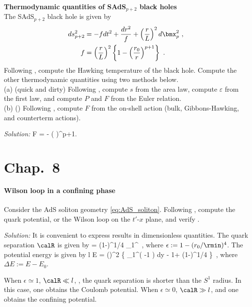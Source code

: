 \begin{prob}
\textbf{Thermodynamic quantities of SAdS$_{p+2}$ black holes}\\
The SAdS$_{p+2}$ black hole is given by
\begin{align}
%
ds_{p+2}^2 &= - f dt^2  + \frac{dr^2}{f} + \left(\frac{r}{L}\right)^2 d\bmx_{p}^2~, \\
f &= \left(\frac{r}{L}\right)^2 \left\{ 1 - \left( \frac{r_0}{r} \right)^{p+1} \right\}~.
%
\end{align}
Following , compute the Hawking temperature of the black hole. Compute the other thermodynamic quantities using two methods below.\\
(a) (quick and dirty) 
Following , compute $s$ from the area law, compute $\varepsilon$ from the first law, and compute $P$ and $F$ from the Euler relation.\\
(b) ()
Following , compute $F$ from the on-shell action (bulk, Gibbons-Hawking, and counterterm actions).
\end{prob}

{\color{blue} 
\textit{Solution:}
\be
%
F = - \left(  \right)^{p+1}.
%
\ee
}


\section*{Chap.~8}%

\begin{prob}
\label{prob:wilson_ads_soliton}
\textbf{Wilson loop in a confining phase}\\
 \\
Consider the AdS soliton geometry \eqref{eq:AdS_soliton}. Following , compute the quark potential, or the Wilson loop on the $t'$-$x$ plane, and verify .
\end{prob}

{\color{blue} 
\textit{Solution:}
It is convenient to express results in dimensionless quantities. The quark separation $\calR$ is given by
\be
%
= (1-\epsilon)^{1/4}
\int_1^\infty {}~,
%
\ee
%
%
where $\epsilon:=1-(r_0/\rmin)^4$.
The potential energy is given by
\be
%
l \Delta E = \left(\right)^2 
\left\{  
\int_1^\infty\left( -1 \right) dy - 1+ (1-\epsilon)^{1/4}
\right\}~,
%
\ee
where $\Delta E :=E-E_0$. 

When $\epsilon \simeq 1$, $\calR \ll l$, \ie, the quark separation is shorter than the $S^1$ radius. In this case, one obtains the Coulomb potential. When $\epsilon \simeq 0$, $\calR \gg l$, and one obtains the confining potential. 
}

